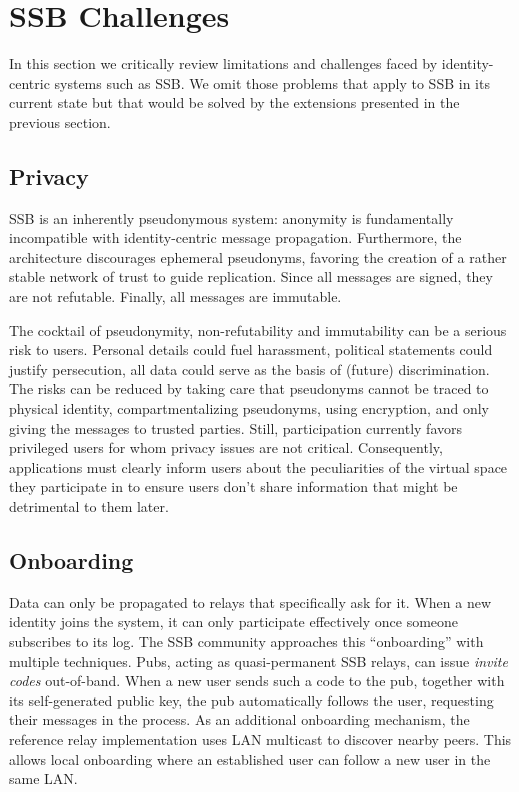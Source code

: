 \documentclass[9pt,sigconf]{acmart}
\begin{document}

\section{SSB Challenges}
\label{sect:nay}

In this section we critically review limitations and challenges faced
by identity-centric systems such as SSB. We omit those problems that
apply to SSB in its current state but that would be solved by the
extensions presented in the previous section.

\subsection{Privacy}

SSB is an inherently pseudonymous system: anonymity is fundamentally
incompatible with identity-centric message propagation. Furthermore,
the architecture discourages ephemeral pseudonyms, favoring the
creation of a rather stable network of trust to guide
replication. Since all messages are signed, they are not
refutable. Finally, all messages are immutable.

The cocktail of pseudonymity, non-refutability and immutability can be
a serious risk to users. Personal details could fuel harassment,
political statements could justify persecution, all data could serve
as the basis of (future) discrimination. The risks can be reduced by
taking care that pseudonyms cannot be traced to physical identity,
compartmentalizing pseudonyms, using encryption, and only giving the
messages to trusted parties. Still, participation currently favors
privileged users for whom privacy issues are not
critical. Consequently, applications must clearly inform users about
the peculiarities of the virtual space they participate in to ensure
users don't share information that might be detrimental to them later.

\subsection{Onboarding}

Data can only be propagated to relays that specifically ask for
it. When a new identity joins the system, it can only participate
effectively once someone subscribes to its log. The SSB community
approaches this ``onboarding'' with multiple techniques. Pubs, acting
as quasi-permanent SSB relays, can issue \textit{invite codes}
out-of-band. When a new user sends such a code to the pub, together
with its self-generated public key, the pub automatically follows the
user, requesting their messages in the process. As an additional
onboarding mechanism, the reference relay implementation uses LAN
multicast to discover nearby peers. This allows local onboarding where
an established user can follow a new user in the same LAN.
\end{document}
